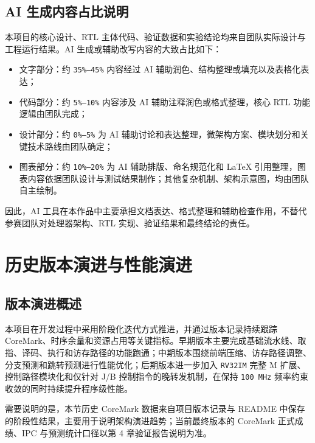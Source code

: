 ﻿\documentclass[12pt,a4paper]{ctexart}
\begin{document}
\subsection{AI 生成内容占比说明}
本项目的核心设计、RTL 主体代码、验证数据和实验结论均来自团队实际设计与工程运行结果。AI 生成或辅助改写内容的大致占比如下：
\begin{itemize}
    \item 文字部分：约 \texttt{35\%--45\%} 内容经过 AI 辅助润色、结构整理或填充以及表格化表达；
    \item 代码部分：约 \texttt{5\%--10\%} 内容涉及 AI 辅助注释润色或格式整理，核心 RTL 功能逻辑由团队完成；
    \item 设计部分：约 \texttt{0\%--5\%} 为 AI 辅助讨论和表达整理，微架构方案、模块划分和关键技术路线由团队确定；
    \item 图表部分：约 \texttt{10\%--20\%} 为 AI 辅助排版、命名规范化和 LaTeX 引用整理，图表内容依据团队设计与测试结果制作；其他复杂机制、架构示意图，均由团队自主绘制。
\end{itemize}

因此，AI 工具在本作品中主要承担文档表达、格式整理和辅助检查作用，不替代参赛团队对处理器架构、RTL 实现、验证结果和最终结论的责任。

\section{历史版本演进与性能演进}

\subsection{版本演进概述}
本项目在开发过程中采用阶段化迭代方式推进，并通过版本记录持续跟踪 CoreMark、时序余量和资源占用等关键指标。早期版本主要完成基础流水线、取指、译码、执行和访存路径的功能跑通；中期版本围绕前端压缩、访存路径调整、分支预测和跳转预测进行性能优化；后期版本进一步加入 \texttt{RV32IM} 完整 M 扩展、控制路径模块化和仅针对 J/B 控制指令的晚转发机制，在保持 \texttt{100 MHz} 频率约束收敛的同时持续提升程序级性能。

需要说明的是，本节历史 CoreMark 数据来自项目版本记录与 README 中保存的阶段性结果，主要用于说明架构演进趋势；当前最终版本的 CoreMark 正式成绩、IPC 与预测统计口径以第 4 章验证报告说明为准。
\end{document}
